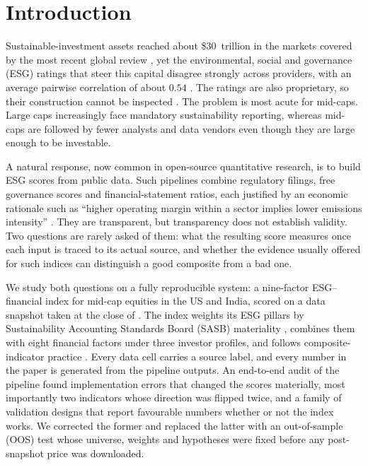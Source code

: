 \section{Introduction}
\label{sec:intro}

Sustainable-investment assets reached about \$30~trillion in the markets
covered by the most recent global review \cite{gsia_2022}, yet the
environmental, social and governance (ESG) ratings that steer this capital
disagree strongly across providers, with an average pairwise correlation of
about $0.54$ \cite{berg_2022, chatterji_2016}. The ratings are also
proprietary, so their construction cannot be inspected
\cite{kotsantonis_2019, christensen_2022}. The problem is most acute for
mid-caps. Large caps increasingly face mandatory sustainability reporting,
whereas mid-caps are followed by fewer analysts and data vendors even though
they are large enough to be investable.

A natural response, now common in open-source quantitative research, is to
build ESG scores from public data. Such pipelines combine regulatory filings,
free governance scores and financial-statement ratios, each justified by an
economic rationale such as ``higher operating margin within a sector implies
lower emissions intensity'' \cite{konar2001does, edmans_2011, damato_2022}.
They are transparent, but transparency does not establish validity. Two
questions are rarely asked of them: what the resulting score measures once
each input is traced to its actual source, and whether the evidence usually
offered for such indices can distinguish a good composite from a bad one.

We study both questions on a fully reproducible system: a nine-factor
ESG--financial index for \NMid mid-cap equities in the US and India, scored
on a data snapshot taken at the close of \SnapshotDate. The index weights its
ESG pillars by Sustainability Accounting Standards Board (SASB) materiality
\cite{khan_2016, sasb_2023}, combines them with eight financial factors under
three investor profiles, and follows composite-indicator practice
\cite{oecd_2008}. Every data cell carries a source label, and every number in
the paper is generated from the pipeline outputs. An end-to-end audit of the
pipeline found implementation errors that changed the scores materially, most
importantly two indicators whose direction was flipped twice, and a family of
validation designs that report favourable numbers whether or not the index
works. We corrected the former and replaced the latter with an
out-of-sample (OOS) test whose universe, weights and hypotheses were fixed
before any post-snapshot price was downloaded.

